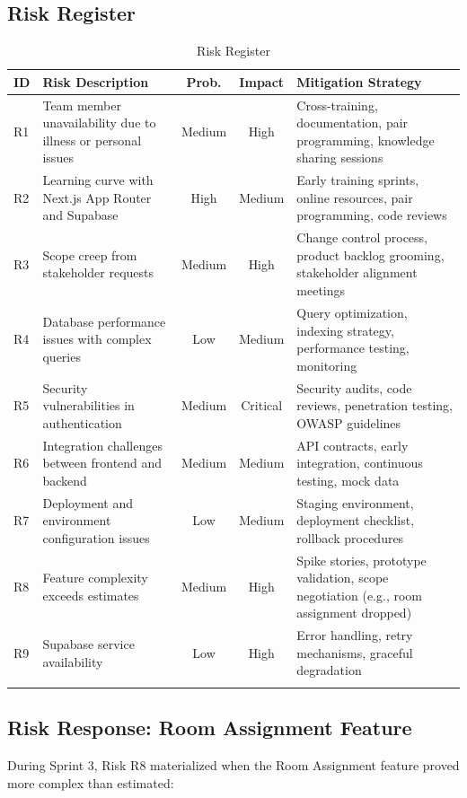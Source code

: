 \documentclass[12pt,a4paper]{article}
\begin{document}
\subsection{Risk Register}

\begin{longtable}{|p{1cm}|p{3.5cm}|c|c|p{4.5cm}|}
\hline
\textbf{ID} & \textbf{Risk Description} & \textbf{Prob.} & \textbf{Impact} & \textbf{Mitigation Strategy} \\
\hline
\endhead
R1 & Team member unavailability due to illness or personal issues & Medium & High & Cross-training, documentation, pair programming, knowledge sharing sessions \\
\hline
R2 & Learning curve with Next.js App Router and Supabase & High & Medium & Early training sprints, online resources, pair programming, code reviews \\
\hline
R3 & Scope creep from stakeholder requests & Medium & High & Change control process, product backlog grooming, stakeholder alignment meetings \\
\hline
R4 & Database performance issues with complex queries & Low & Medium & Query optimization, indexing strategy, performance testing, monitoring \\
\hline
R5 & Security vulnerabilities in authentication & Medium & Critical & Security audits, code reviews, penetration testing, OWASP guidelines \\
\hline
R6 & Integration challenges between frontend and backend & Medium & Medium & API contracts, early integration, continuous testing, mock data \\
\hline
R7 & Deployment and environment configuration issues & Low & Medium & Staging environment, deployment checklist, rollback procedures \\
\hline
R8 & Feature complexity exceeds estimates & Medium & High & Spike stories, prototype validation, scope negotiation (e.g., room assignment dropped) \\
\hline
R9 & Supabase service availability & Low & High & Error handling, retry mechanisms, graceful degradation \\
\hline
\caption{Risk Register}
\end{longtable}

\subsection{Risk Response: Room Assignment Feature}

During Sprint 3, Risk R8 materialized when the Room Assignment feature proved more complex than estimated:
\end{document}
